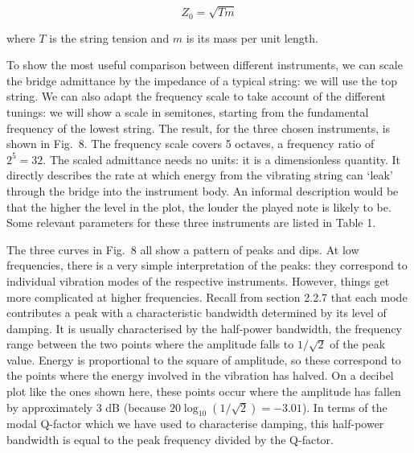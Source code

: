   $$Z_0=\sqrt{T m}$$ 

  where $T$ is the string tension and $m$ is its mass per unit length. 


  To show the most useful comparison between different instruments, we can 
  scale the bridge admittance by the impedance of a typical string: we will use 
  the top string. We can also adapt the frequency scale to take account of the 
  different tunings: we will show a scale in semitones, starting from the 
  fundamental frequency of the lowest string. The result, for the three chosen 
  instruments, is shown in Fig.\ 8. The frequency scale covers 5 octaves, a 
  frequency ratio of $2^5=32$. The scaled admittance needs no units: it is a 
  dimensionless quantity. It directly describes the rate at which energy from 
  the vibrating string can `leak' through the bridge into the instrument body. 
  An informal description would be that the higher the level in the plot, the 
  louder the played note is likely to be. Some relevant parameters for these 
  three instruments are listed in Table 1. 


  The three curves in Fig.\ 8 all show a pattern of peaks and dips. At low 
  frequencies, there is a very simple interpretation of the peaks: they 
  correspond to individual vibration modes of the respective instruments. 
  However, things get more complicated at higher frequencies. Recall from 
  section 2.2.7 that each mode contributes a peak with a characteristic 
  bandwidth determined by its level of damping. It is usually characterised by 
  the half-power bandwidth, the frequency range between the two points where 
  the amplitude falls to $1/\sqrt{2}$ of the peak value. Energy is proportional 
  to the square of amplitude, so these correspond to the points where the 
  energy involved in the vibration has halved. On a decibel plot like the ones 
  shown here, these points occur where the amplitude has fallen by 
  approximately 3 dB (because $20 \log_{10} (1/\sqrt{2}) = -3.01$). In terms of 
  the modal Q-factor which we have used to characterise damping, this 
  half-power bandwidth is equal to the peak frequency divided by the Q-factor. 

